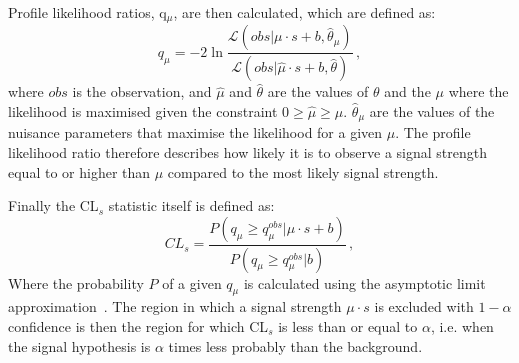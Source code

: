 Profile likelihood ratios, q$_{\mu}$, are then calculated, which are defined as:
\begin{equation}
  \label{eq:proflikelihood}
  q_{\mu} = -2 \ln\frac{\mathcal{L}(obs|\mu \cdot s + b,\hat{\theta}_{\mu})}{\mathcal{L}(obs|\hat{\mu} \cdot s + b,\hat{\theta})}\,,
\end{equation}
where $obs$ is the observation, and $\hat{\mu}$ and $\hat{\theta}$ are the values of $\theta$ and the $\mu$ where the likelihood is maximised given the constraint $0 \geqslant \hat{\mu} \geqslant \mu$. $\hat{\theta}_{\mu}$ are the values of the nuisance parameters that maximise the likelihood for a given $\mu$. The profile likelihood ratio therefore describes how likely it is to observe a signal strength equal to or higher than $\mu$ compared to the most likely signal strength.

Finally the CL$_{s}$ statistic itself is defined as:
\begin{equation}
  \label{eq:cls}
  CL_{s} = \frac{P(q_{\mu}\geqslant q_{\mu}^{obs} | \mu \cdot s + b)}{P(q_{\mu}\geqslant q_{\mu}^{obs}|b)}\,,
\end{equation}
Where the probability $P$ of a given $q_{\mu}$ is calculated using the asymptotic limit approximation~\cite{Cowan:2010js}. The region in which a signal strength $\mu \cdot s$ is excluded with $1 - \alpha$ confidence is then the region for which CL$_{s}$ is less than or equal to $\alpha$, i.e. when the signal hypothesis is $\alpha$ times less probably than the background.
